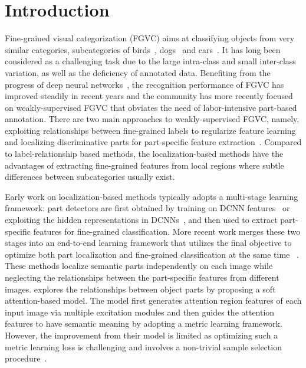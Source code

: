 \documentclass[10pt,twocolumn,letterpaper]{article}
\begin{document}
\section{Introduction}
\label{sec:intro}
Fine-grained visual categorization (FGVC) aims at classifying objects from very similar categories, \eg subcategories of birds~\cite{cubbirds11caltech,nabirds15Perona}, dogs~\cite{stdogs11feifei} and cars~\cite{stcars13feifei}. It has long been considered as a challenging task due to the large intra-class and small inter-class variation, as well as the deficiency of annotated data. Benefiting from the progress of deep neural networks~\cite{alexnet12hiton,vggnet15zisserman,googlenet15Szegedy,resnet16kaiming}, the recognition performance of FGVC has improved steadily in recent years and the community has more recently focused on weakly-supervised FGVC that obviates the need of labor-intensive part-based annotation. There are two main approaches to weakly-supervised FGVC, namely, exploiting relationships between fine-grained labels to regularize feature learning~\cite{multigranularity@iccv,hyperlabels@cvpr} and localizing discriminative parts for part-specific feature extraction~\cite{racnn@mei,ntscnn@eccv}. Compared to label-relationship based methods, the localization-based methods have the advantages of extracting fine-grained features from local regions where subtle differences between subcategories usually exist. 

Early work on localization-based methods typically adopts a multi-stage learning framework: part detectors are first obtained by training on DCNN features~\cite{augstronglysup@cvpr} or exploiting the hidden representations in DCNNs~\cite{twolevelattention@cvpr,neuralconstellations@iccv,pickfilter@tianqi}, and then used to extract part-specific features for fine-grained classification. 
More recent work merges these two stages into an end-to-end learning framework that utilizes the final objective to optimize both part localization and fine-grained classification at the same time ~\cite{racnn@mei,macnn@mei,ntscnn@eccv,dfbnet18larry}.
These methods localize semantic parts independently on each image while neglecting the relationships between the part-specific features from different images. \cite{mamc18eccv} explores the relationships between object parts by proposing a soft attention-based model. The model first generates attention region features of each input image via multiple excitation modules and then guides the attention features to have semantic meaning by adopting a metric learning framework.
However, the improvement from their model is limited as optimizing such a metric learning loss is challenging and involves a non-trivial sample selection procedure~\cite{wu2017sampling}.
\end{document}
